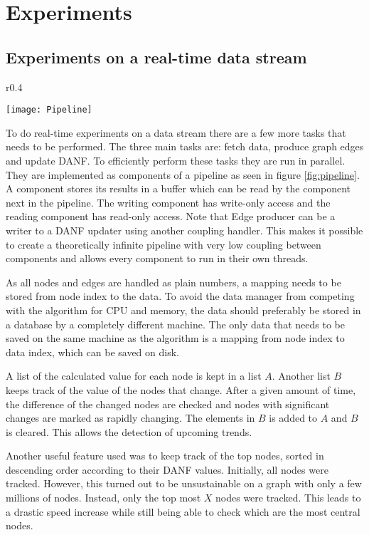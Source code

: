 \chapter{Experiments}

\section{Experiments on a real-time data stream}

\begin{wrapfigure}{r}{0.4\textwidth}
  \begin{center}
    \texttt{[image: Pipeline]}
  \end{center}
  \caption{Parallel-compatible pipeline layout}
  \label{fig:pipeline}
\end{wrapfigure}

To do real-time experiments on a data stream there are a few more tasks that needs to be performed. The three main tasks are: fetch data, produce graph edges and update DANF. To efficiently perform these tasks they are run in parallel. They are implemented as components of a pipeline as seen in figure \ref{fig:pipeline}. A component stores its results in a buffer which can be read by the component next in the pipeline. The writing component has write-only access and the reading component has read-only access. Note that Edge producer can be a writer to a DANF updater using another coupling handler. This makes it possible to create a theoretically infinite pipeline with very low coupling between components and allows every component to run in their own threads.

As all nodes and edges are handled as plain numbers, a mapping needs to be stored from node index to the data. To avoid the data manager from competing with the algorithm for CPU and memory, the data should preferably be stored in a database by a completely different machine. The only data that needs to be saved on the same machine as the algorithm is a mapping from node index to data index, which can be saved on disk.

A list of the calculated value for each node is kept in a list $A$. Another list $B$ keeps track of the value of the nodes that change. After a given amount of time, the difference of the changed nodes are checked and nodes with significant changes are marked as rapidly changing. The elements in $B$ is added to $A$ and $B$ is cleared. This allows the detection of upcoming trends. 

Another useful feature used was to keep track of the top nodes, sorted in descending order according to their DANF values. Initially, all nodes were tracked. However, this turned out to be unsustainable on a graph with only a few millions of nodes. Instead, only the top most $X$ nodes were tracked. This leads to a drastic speed increase while still being able to check which are the most central nodes. 


